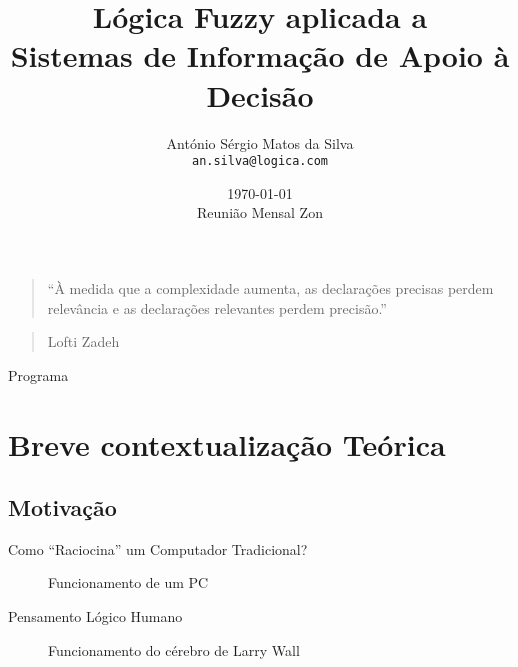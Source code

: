\documentclass[portuges]{beamer}
\title[Fuzzy \& SIAD] %
{Lógica Fuzzy aplicada a \\Sistemas de Informação de Apoio à Decisão}
\author[António Sérgio Matos da Silva] %
{António Sérgio Matos da Silva \\ \texttt{an.silva@logica.com}}
\institute[Logica] %
{
  Telecommunication Business\\
  Logica
}
\date[Reunião Mensal Zon] %
{\today\\Reunião Mensal Zon}
\begin{document}
\begin{frame}
  \titlepage
\end{frame}

\begin{frame}
\begin{quote}
``À medida que a complexidade aumenta, 
as declarações precisas perdem relevância e as declarações relevantes perdem precisão.'' 
\end{quote}
\begin{quote}
Lofti Zadeh
\end{quote}
\end{frame}

\begin{frame}{Programa}
  \tableofcontents[pausesections]
\end{frame}

\section{Breve contextualização Teórica}
\subsection{Motivação}

\begin{frame}{Como ``Raciocina'' um Computador Tradicional?}
\begin{figure}
\centering
{}
\caption{Funcionamento de um PC}
\end{figure}
\end{frame}


\begin{frame}{Pensamento Lógico Humano}
\begin{figure}
\centering
{}
\caption{Funcionamento do cérebro de Larry Wall}
\end{figure}
\end{frame}
\end{document}
